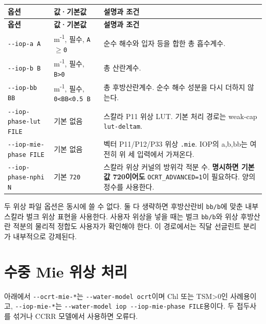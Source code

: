 {\TableFont
\begin{longtable}{@{}>{\raggedright\arraybackslash}p{}>{\raggedright\arraybackslash}p{}>{\raggedright\arraybackslash}p{}@{}}
\toprule
\textbf{옵션} & \textbf{값·기본값} & \textbf{설명과 조건} \\
\midrule
\endfirsthead
\toprule
\textbf{옵션} & \textbf{값·기본값} & \textbf{설명과 조건} \\
\midrule
\endhead
\bottomrule
\endfoot
\texttt{-\allowbreak{}-\allowbreak{}iop-\allowbreak{}a A} & m\textsuperscript{-}\textsuperscript{1}, 필수, \texttt{A\ensuremath{\geq}0} & 순수 해수와 입자 등을 합한 총 흡수계수. \\
\texttt{-\allowbreak{}-\allowbreak{}iop-\allowbreak{}b B} & m\textsuperscript{-}\textsuperscript{1}, 필수, \texttt{B>0} & 총 산란계수. \\
\texttt{-\allowbreak{}-\allowbreak{}iop-\allowbreak{}bb BB} & m\textsuperscript{-}\textsuperscript{1}, 필수, \texttt{0<BB<0.\allowbreak{}5 B} & 총 후방산란계수. 순수 해수 성분을 다시 더하지 않는다. \\
\texttt{-\allowbreak{}-\allowbreak{}iop-\allowbreak{}phase-\allowbreak{}lut FILE} & 기본 없음 & 스칼라 P11 위상 LUT. 기본 처리 경로는 weak-cap \texttt{lut-\allowbreak{}deltam}. \\
\texttt{-\allowbreak{}-\allowbreak{}iop-\allowbreak{}mie-\allowbreak{}phase FILE} & 기본 없음 & 벡터 P11/P12/P33 위상 \texttt{.\allowbreak{}mie}. IOP의 a,b,bb는 여전히 위 세 입력에서 가져온다. \\
\texttt{-\allowbreak{}-\allowbreak{}iop-\allowbreak{}phase-\allowbreak{}nphi N} & 기본 \texttt{720} & 스칼라 위상 커널의 방위각 적분 수. \textbf{명시하면 기본값 720이어도} \texttt{OCRT\_\allowbreak{}ADVANCED=\allowbreak{}1}이 필요하다. 양의 정수를 사용한다. \\
\end{longtable}
}

두 위상 파일 옵션은 동시에 쓸 수 없다. 둘 다 생략하면 후방산란비 \texttt{bb/\allowbreak{}b}에 맞춘 내부 스칼라 벌크 위상 표현을 사용한다. 사용자 위상을 넣을 때는 벌크 \texttt{bb/\allowbreak{}b}와 위상 후방산란 적분의 물리적 정합도 사용자가 확인해야 한다. 이 경로에서는 직달 선글린트 분리가 내부적으로 강제된다.

\section{수중 Mie 위상 처리}
\label{sec:auto:03_options:6}
아래에서 \texttt{-\allowbreak{}-\allowbreak{}ocrt-\allowbreak{}mie-\allowbreak{}*}는 \texttt{-\allowbreak{}-\allowbreak{}water-\allowbreak{}model ocrt}이며 Chl 또는 TSM>0인 사례용이고, \texttt{-\allowbreak{}-\allowbreak{}iop-\allowbreak{}mie-\allowbreak{}*}는 \texttt{-\allowbreak{}-\allowbreak{}water-\allowbreak{}model iop -\allowbreak{}-\allowbreak{}iop-\allowbreak{}mie-\allowbreak{}phase FILE}용이다. 두 접두사를 섞거나 CCRR 모델에서 사용하면 오류다.


